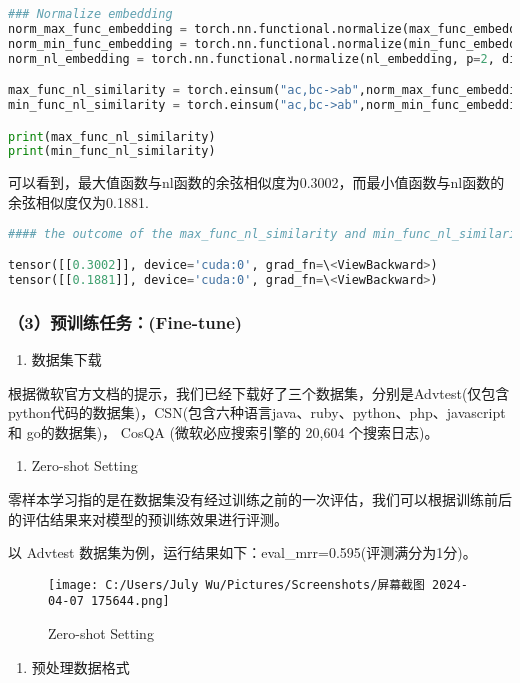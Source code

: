 \documentclass[12pt]{article}
\begin{document}
\begin{lstlisting}[language=Python]
### Normalize embedding
norm_max_func_embedding = torch.nn.functional.normalize(max_func_embedding, p=2, dim=1)
norm_min_func_embedding = torch.nn.functional.normalize(min_func_embedding, p=2, dim=1)
norm_nl_embedding = torch.nn.functional.normalize(nl_embedding, p=2, dim=1)

max_func_nl_similarity = torch.einsum("ac,bc->ab",norm_max_func_embedding,norm_nl_embedding)
min_func_nl_similarity = torch.einsum("ac,bc->ab",norm_min_func_embedding,norm_nl_embedding)

print(max_func_nl_similarity)
print(min_func_nl_similarity)
\end{lstlisting}
可以看到，最大值函数与nl函数的余弦相似度为0.3002，而最小值函数与nl函数的余弦相似度仅为0.1881.
\begin{lstlisting}[language=Python]
#### the outcome of the max_func_nl_similarity and min_func_nl_similarity

tensor([[0.3002]], device='cuda:0', grad_fn=\<ViewBackward>)
tensor([[0.1881]], device='cuda:0', grad_fn=\<ViewBackward>)
\end{lstlisting}

\subsubsection*{（3）预训练任务：(Fine-tune)}

\begin{enumerate}
      \item
            数据集下载
\end{enumerate}

根据微软官方文档的提示，我们已经下载好了三个数据集，分别是Advtest(仅包含python代码的数据集)，CSN(包含六种语言java、ruby、python、php、javascript
和 go的数据集)， CosQA (微软必应搜索引擎的 20,604 个搜索日志)。

\begin{enumerate}[resume]
      \item
            Zero-shot Setting
\end{enumerate}
零样本学习指的是在数据集没有经过训练之前的一次评估，我们可以根据训练前后的评估结果来对模型的预训练效果进行评测。

以 Advtest 数据集为例，运行结果如下：eval\_mrr=0.595(评测满分为1分)。

\begin{figure}
      \centering
      \texttt{[image: C:/Users/July Wu/Pictures/Screenshots/屏幕截图 2024-04-07 175644.png]}
      \caption{Zero-shot Setting}
      \label{fig:Zero-shot Setting}

\end{figure}
\begin{enumerate}[resume]
      \item
            预处理数据格式
\end{enumerate}
\end{document}
